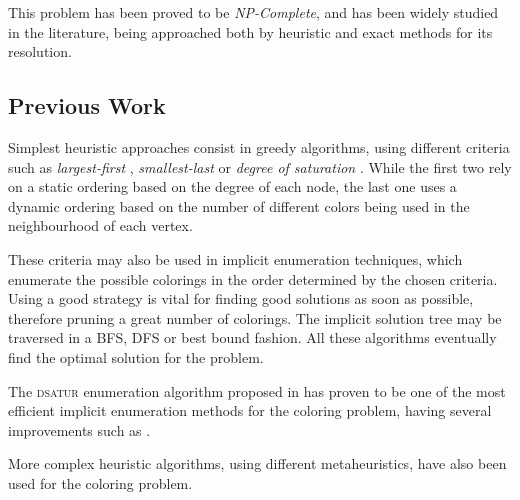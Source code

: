 This problem has been proved to be \textit{NP-Complete}, and has been widely studied in the literature, being approached both by heuristic and exact methods for its resolution.

\subsection*{Previous Work}

Simplest heuristic approaches consist in greedy algorithms, using different criteria such as \textit{largest-first} \cite{welsh1967upper}, \textit{smallest-last} \cite{matula1972graph} or \textit{degree of saturation} \cite{brelaz1979new}. While the first two rely on a static ordering based on the degree of each node, the last one uses a dynamic ordering based on the number of different colors being used in the neighbourhood of each vertex.

These criteria may also be used in implicit enumeration techniques, which enumerate the possible colorings in the order determined by the chosen criteria. Using a good strategy is vital for finding good solutions as soon as possible, therefore pruning a great number of colorings. The implicit solution tree may be traversed in a BFS, DFS or best bound fashion. All these algorithms eventually find the optimal solution for the problem.

The \textsc{dsatur} enumeration algorithm proposed in \cite{brelaz1979new} has proven to be one of the most efficient implicit enumeration methods for the coloring problem, having several improvements such as \cite{sewell1996improved}.

More complex heuristic algorithms, using different metaheuristics, have also been used for the coloring problem.

